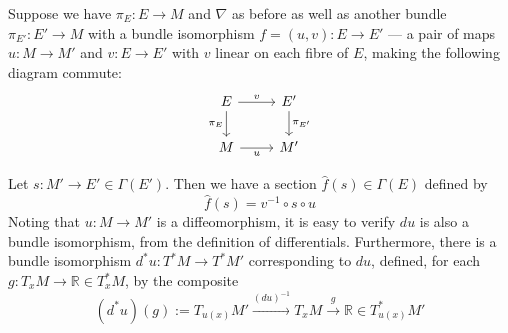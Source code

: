\documentclass{amsart}
\newcommand{\R}{\mathbb{R}}
\newcommand{\wh}{\widehat}
\renewcommand{\to}[1][]{\stackrel{#1}{\longrightarrow}}
\numberwithin{thm}{section}
\theoremstyle{definition}
\begin{document}
Suppose we have $\pi_E : E \to M$ and $\nabla$ as before as well as another
bundle $\pi_{E'} : E' \to M$ with a bundle isomorphism $f = (u, v) : E \to E'$
--- a pair of maps $u : M \to M'$ and $v : E \to E'$ with $v$ linear on each
fibre of $E$, making the following diagram commute:
\[\begin{tikzcd}
E \ar[d, "\pi_E" left] \ar[r, "v" above] & E' \ar[d, "\pi_{E'}" right]\\
M \ar[r, "u" below] & M'
\end{tikzcd}\]

Let $s : M' \to E' \in \Gamma(E')$. Then we have a section
$\wh{f}(s) \in \Gamma(E)$ defined by
\[
  \wh{f}(s) = v^{-1} \circ s \circ u
\]
Noting that $u : M \to M'$ is a diffeomorphism, it is easy to verify $du$
is also a bundle isomorphism, from the definition of differentials. Furthermore,
there is a bundle isomorphism $d^*u : T^*M \to T^*M'$ corresponding to $du$,
defined, for each $g : T_xM \to \R \in T^*_xM$, by the composite
\[
  (d^*u)(g) := T_{u(x)}M' \to[(du)^{-1}] T_xM \to[g] \R \in T^*_{u(x)}M'
\]
\end{document}
